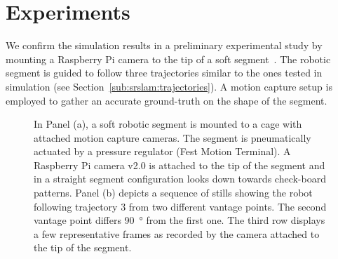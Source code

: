 \section{Experiments} \label{sec:srslam:experiments}
We confirm the simulation results in a preliminary experimental study by mounting a Raspberry Pi camera to the tip of a soft segment~\cite{katzschmann2019dynamic}. The robotic segment is guided to follow three trajectories similar to the ones tested in simulation (see Section~\ref{sub:srslam:trajectories}). %
A motion capture setup is employed to gather an accurate ground-truth on the shape of the segment.

\begin{figure}
     \centering
     \caption{ In Panel (a), a soft robotic segment is mounted to a cage with attached motion capture cameras. The segment is pneumatically actuated by a pressure regulator (Fest Motion Terminal). A Raspberry Pi camera v2.0 is attached to the tip of the segment and in a straight segment configuration looks down towards check-board patterns. Panel (b) depicts a sequence of stills showing the robot following trajectory 3 from two different vantage points. The second vantage point differs \SI{90}{\degree} from the first one. The third row displays a few representative frames as recorded by the camera attached to the tip of the segment.}
\end{figure}

